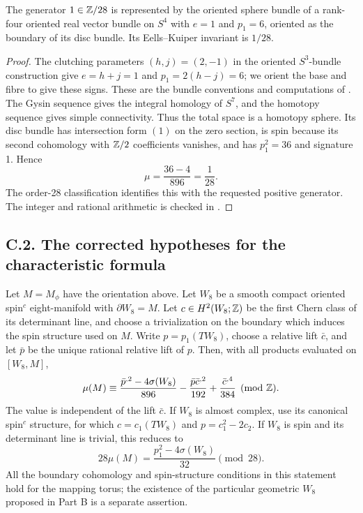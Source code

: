 \begin{proposition}
The generator $1\in\mathbb Z/28$ is represented by the oriented sphere
bundle of a rank-four oriented real vector bundle on $S^4$ with
$e=1$ and $p_1=6$, oriented as the boundary of its disc bundle.
Its Eells--Kuiper invariant is $1/28$.
\end{proposition}
\begin{proof}
The clutching parameters $(h,j)=(2,-1)$ in the oriented
$S^3$-bundle construction give $e=h+j=1$ and $p_1=2(h-j)=6$;
we orient the base and fibre to give these signs. These are the
bundle conventions and computations of \citet[Section 6,
equations (12)--(13)]{EellsKuiper1962}. The Gysin sequence gives
the integral homology of $S^7$, and the homotopy sequence gives
simple connectivity. Thus the total space is a homotopy sphere.
Its disc bundle has intersection form $(1)$ on the zero section,
is spin because its second cohomology with $\mathbb Z/2$ coefficients
vanishes, and has $p_1^2=36$ and signature 1. Hence
\[
 \mu=\frac{36-4}{896}=\frac1{28}.
\]
The order-28 classification identifies this with the requested
positive generator. The integer and rational arithmetic is checked
in .
\end{proof}

\subsection{C.2. The corrected hypotheses for the characteristic formula}

\begin{theorem}
Let $M=M_\phi$ have the orientation above. Let $W_8$ be a smooth
compact oriented spin$^c$ eight-manifold with $\partial W_8=M$.
Let $c\in H^2(W_8;\mathbb Z)$ be the first Chern class of its determinant
line, and choose a trivialization on the boundary which induces the
spin structure used on $M$. Write $p=p_1(TW_8)$, choose a relative
lift $\bar c$, and let $\bar p$ be the unique rational relative lift
of $p$. Then, with all products evaluated on $[W_8,M]$,
\begin{equation}\label{eq:c-spin-c}
 \mu(M)\equiv
 \frac{\bar p^{,2}-4\sigma(W_8)}{896}
 -\frac{\bar p\bar c^{,2}}{192}
 +\frac{\bar c^{,4}}{384}\pmod{\mathbb Z}.
\end{equation}
The value is independent of the lift $\bar c$. If $W_8$ is almost
complex, use its canonical spin$^c$ structure, for which
$c=c_1(TW_8)$ and $p=c_1^2-2c_2$. If $W_8$ is spin and its
determinant line is trivial, this reduces to
\[
 28\mu(M)=\frac{p_1^2-4\sigma(W_8)}{32}\pmod{28}.
\]
All the boundary cohomology and spin-structure conditions in this
statement hold for the mapping torus; the existence of the particular
geometric $W_8$ proposed in Part B is a separate assertion.
\end{theorem}

